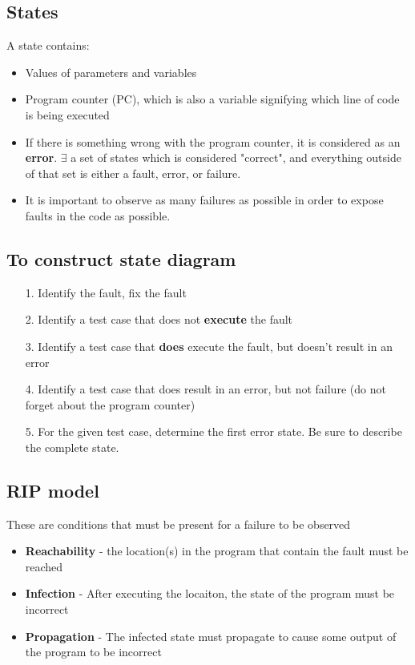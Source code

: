 \documentclass[12pt]{book}
\begin{document}
\subsection*{States}
A state contains:
\begin{itemize}
  \item Values of parameters and variables
  \item Program counter (PC), which is also a variable signifying which line of code is being executed
  \item If there is something wrong with the program counter, it is considered as an \textbf{error}. $\exists$ a set of states which is considered "correct", and everything outside of that set is either a fault, error, or failure.
  \item It is important to observe as many failures as possible in order to expose faults in the code as possible.
\end{itemize}

\subsection*{To construct state diagram}

\begin{itemize}
  \item[1.] Identify the fault, fix the fault
  \item[2.] Identify a test case that does not \textbf{execute} the fault
  \item[3.] Identify a test case that \textbf{does} execute the fault, but doesn't result in an error
  \item[4.] Identify a test case that does result in an error, but not failure (do not forget about the program counter)
  \item[5.] For the given test case, determine the first error state. Be sure to describe the complete state.
\end{itemize}

\subsection*{RIP model}
These are conditions that must be present for a failure to be observed
\begin{itemize}
  \item \textbf{Reachability} - the location(s) in the program that contain the fault must be reached
  \item \textbf{Infection} - After executing the locaiton, the state of the program must be incorrect
  \item \textbf{Propagation} - The infected state must propagate to cause some output of the program to be incorrect
\end{itemize}
\end{document}

